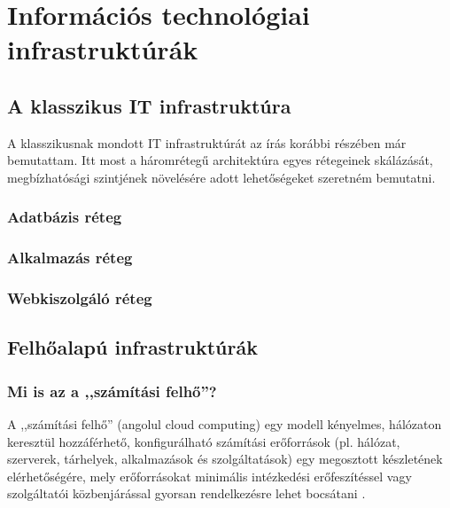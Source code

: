 \chapter{Információs technológiai infrastruktúrák}
\section{A klasszikus IT infrastruktúra}
A klasszikusnak mondott IT infrastruktúrát az írás korábbi részében már bemutattam. Itt most a háromrétegű architektúra egyes rétegeinek skálázását, megbízhatósági szintjének növelésére adott lehetőségeket szeretném bemutatni.
\subsection{Adatbázis réteg}
\subsection{Alkalmazás réteg}
\subsection{Webkiszolgáló réteg}
\section{Felhőalapú infrastruktúrák}
\subsection{Mi is az a ,,számítási felhő''?}

A ,,számítási felhő'' (angolul \foreignlanguage{english}{cloud computing}) egy modell kényelmes, hálózaton keresztül hozzáférhető, konfigurálható számítási erőforrások (pl. hálózat, szerverek, tárhelyek, alkalmazások és szolgáltatások) egy megosztott készletének elérhetőségére, mely erőforrásokat minimális intézkedési erőfeszítéssel vagy szolgáltatói közbenjárással gyorsan rendelkezésre lehet bocsátani \cite{nistsp800-145}.

